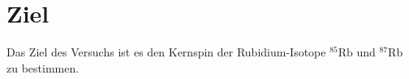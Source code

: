 \section{Ziel}
\label{sec:ziel}

Das Ziel des Versuchs ist es den Kernspin der Rubidium-Isotope $^{85}\text{Rb}$ und $^{87}\text{Rb}$ zu bestimmen.